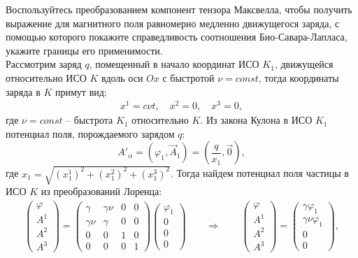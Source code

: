 \documentclass[__main__.tex]{subfiles}
\begin{document}
Воспользуйтесь преобразованием компонент тензора Максвелла, чтобы получить выражение для магнитного поля равномерно медленно движущегося заряда, с помощью которого покажите справедливость соотношения Био-Савара-Лапласа, укажите границы его применимости.\\ 

Рассмотрим заряд $q$, помещенный в начало координат ИСО $K_1$, движущейся относительно ИСО $K$ вдоль оси $Ox$ с быстротой $\nu=const$, тогда координаты заряда в $K$ примут вид:
\begin{gather*}
x^1 = c\nu t, \quad x^2 = 0, \quad x^3 = 0,
\end{gather*}
где $\nu = const$ -- быстрота $K_1$ относительно $K$.
Из закона Кулона в ИСО $K_1$ потенциал поля, порождаемого зарядом $q$:
$$
A'_{\alpha} = (\varphi_1, \vec{A}_1) = (\frac{q}{x_1},\vec{0}),
$$
где $x_1=\sqrt{\left(x^1_1\right)^2+\left(x^2_1\right)^2+\left(x^3_1\right)^2}$.
Тогда найдем потенциал поля частицы в ИСО $K$ из преобразований Лоренца:
\begin{gather}
\label{e-05-potlorenz}
\left(
\begin{matrix}
\varphi\\ A^1\\ A^2\\ A^3
\end{matrix}
\right) = 
\left(
\begin{matrix}
\gamma    & \gamma\nu & 0 & 0 \\
\gamma\nu &    \gamma & 0 & 0 \\
0 &         0 & 1 & 0 \\
0 &         0 & 0 & 1
\end{matrix}
\right)
\left(
\begin{matrix}
\varphi_1 \\ 0\\ 0\\ 0
\end{matrix}
\right) \qquad \Rightarrow \qquad
\left(
\begin{matrix}
\varphi\\ A^1\\ A^2\\ A^3
\end{matrix}
\right) =
\left(
\begin{matrix}
\gamma \varphi_1\\ \gamma \nu \varphi_1\\ 0\\ 0
\end{matrix}
\right),
\end{gather}
\end{document}

